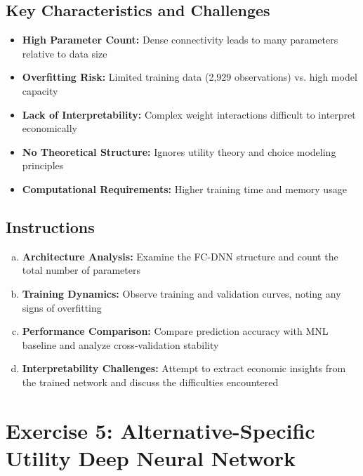 \documentclass[11pt]{article}
\begin{document}
\subsection*{Key Characteristics and Challenges}

\begin{itemize}
\item \textbf{High Parameter Count:} Dense connectivity leads to many parameters relative to data size
\item \textbf{Overfitting Risk:} Limited training data (2,929 observations) vs. high model capacity
\item \textbf{Lack of Interpretability:} Complex weight interactions difficult to interpret economically
\item \textbf{No Theoretical Structure:} Ignores utility theory and choice modeling principles
\item \textbf{Computational Requirements:} Higher training time and memory usage
\end{itemize}

\subsection*{Instructions}

\begin{enumerate}[(a)]
\item \textbf{Architecture Analysis:} Examine the FC-DNN structure and count the total number of parameters
\item \textbf{Training Dynamics:} Observe training and validation curves, noting any signs of overfitting
\item \textbf{Performance Comparison:} Compare prediction accuracy with MNL baseline and analyze cross-validation stability
\item \textbf{Interpretability Challenges:} Attempt to extract economic insights from the trained network and discuss the difficulties encountered
\end{enumerate}

\section*{Exercise 5: Alternative-Specific Utility Deep Neural Network}

\begin{center}
\end{center}
\end{document}
